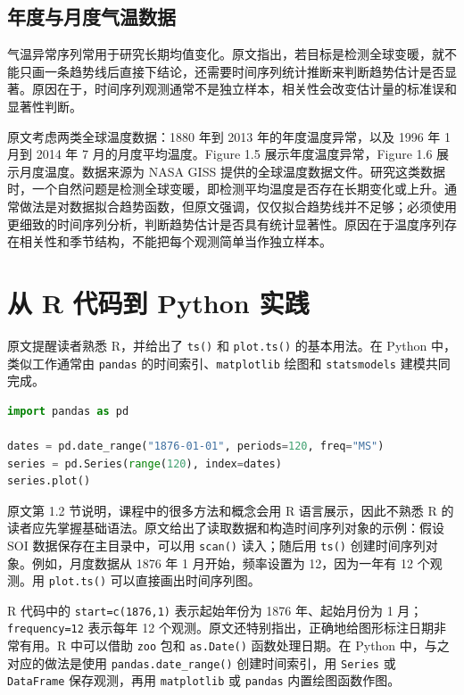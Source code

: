 \documentclass[11pt,a4paper,openany]{ctexbook}
\begin{document}
\subsection{年度与月度气温数据}

气温异常序列常用于研究长期均值变化。原文指出，若目标是检测全球变暖，就不能只画一条趋势线后直接下结论，还需要时间序列统计推断来判断趋势估计是否显著。原因在于，时间序列观测通常不是独立样本，相关性会改变估计量的标准误和显著性判断。

原文考虑两类全球温度数据：1880 年到 2013 年的年度温度异常，以及 1996 年 1 月到 2014 年 7 月的月度平均温度。Figure 1.5 展示年度温度异常，Figure 1.6 展示月度温度。数据来源为 NASA GISS 提供的全球温度数据文件。研究这类数据时，一个自然问题是检测全球变暖，即检测平均温度是否存在长期变化或上升。通常做法是对数据拟合趋势函数，但原文强调，仅仅拟合趋势线并不足够；必须使用更细致的时间序列分析，判断趋势估计是否具有统计显著性。原因在于温度序列存在相关性和季节结构，不能把每个观测简单当作独立样本。

\section{从 R 代码到 Python 实践}

原文提醒读者熟悉 R，并给出了 \texttt{ts()} 和 \texttt{plot.ts()} 的基本用法。在 Python 中，类似工作通常由 \texttt{pandas} 的时间索引、\texttt{matplotlib} 绘图和 \texttt{statsmodels} 建模共同完成。

\begin{lstlisting}[language=Python, caption={Python 中构造月度时间序列的基本模式}]
import pandas as pd

dates = pd.date_range("1876-01-01", periods=120, freq="MS")
series = pd.Series(range(120), index=dates)
series.plot()
\end{lstlisting}

原文第 1.2 节说明，课程中的很多方法和概念会用 R 语言展示，因此不熟悉 R 的读者应先掌握基础语法。原文给出了读取数据和构造时间序列对象的示例：假设 SOI 数据保存在主目录中，可以用 \texttt{scan()} 读入；随后用 \texttt{ts()} 创建时间序列对象。例如，月度数据从 1876 年 1 月开始，频率设置为 12，因为一年有 12 个观测。用 \texttt{plot.ts()} 可以直接画出时间序列图。

R 代码中的 \texttt{start=c(1876,1)} 表示起始年份为 1876 年、起始月份为 1 月；\texttt{frequency=12} 表示每年 12 个观测。原文还特别指出，正确地给图形标注日期非常有用。R 中可以借助 \texttt{zoo} 包和 \texttt{as.Date()} 函数处理日期。在 Python 中，与之对应的做法是使用 \texttt{pandas.date\_range()} 创建时间索引，用 \texttt{Series} 或 \texttt{DataFrame} 保存观测，再用 \texttt{matplotlib} 或 \texttt{pandas} 内置绘图函数作图。
\end{document}

